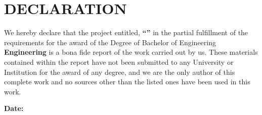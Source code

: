 \chapter*{DECLARATION}
{} %

\noindent We hereby declare that the project entitled, \textbf{``\cTitle''} in the partial fulfillment  of the requirements for the award of the Degree of Bachelor of Engineering \textbf{Engineering} is a bona fide report of the work carried out by us. These materials contained within the report have not been submitted to any University or Institution for the award of any degree, and we are the only author of this complete work and no sources other than the listed ones have been used in this work.
\vspace{0.5cm}

\noindent \authorTable

\noindent \textbf{Date:} \cDate

